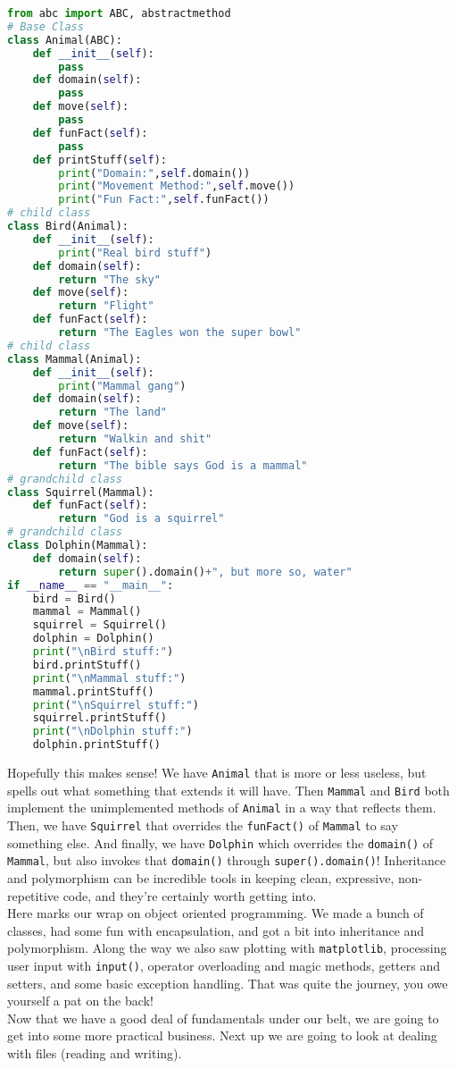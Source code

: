 \documentclass[12pt]{article}
\begin{document}
\begin{lstlisting}[language=Python]
from abc import ABC, abstractmethod 
# Base Class
class Animal(ABC):
    def __init__(self):
        pass
    def domain(self):
        pass
    def move(self):
        pass
    def funFact(self):
        pass
    def printStuff(self):
        print("Domain:",self.domain())
        print("Movement Method:",self.move())
        print("Fun Fact:",self.funFact())
# child class
class Bird(Animal):
    def __init__(self):
        print("Real bird stuff")
    def domain(self):
        return "The sky"
    def move(self):
        return "Flight"
    def funFact(self):
        return "The Eagles won the super bowl"
# child class
class Mammal(Animal):
    def __init__(self):
        print("Mammal gang")
    def domain(self):
        return "The land"
    def move(self):
        return "Walkin and shit"
    def funFact(self):
        return "The bible says God is a mammal"
# grandchild class
class Squirrel(Mammal):
    def funFact(self):
        return "God is a squirrel"
# grandchild class
class Dolphin(Mammal):
    def domain(self):
        return super().domain()+", but more so, water"
if __name__ == "__main__":
    bird = Bird()
    mammal = Mammal()
    squirrel = Squirrel()
    dolphin = Dolphin()
    print("\nBird stuff:")
    bird.printStuff()
    print("\nMammal stuff:")
    mammal.printStuff()
    print("\nSquirrel stuff:")
    squirrel.printStuff()
    print("\nDolphin stuff:")
    dolphin.printStuff()
\end{lstlisting}
Hopefully this makes sense! We have \texttt{Animal} that is more or less useless, but spells out what something that extends it will have. Then \texttt{Mammal} and \texttt{Bird} both implement the unimplemented methods of \texttt{Animal} in a way that reflects them. Then, we have \texttt{Squirrel} that overrides the \texttt{funFact()} of \texttt{Mammal} to say something else. And finally, we have \texttt{Dolphin} which overrides the \texttt{domain()} of \texttt{Mammal}, but also invokes that \texttt{domain()} through \texttt{super().domain()}! Inheritance and polymorphism can be incredible tools in keeping clean, expressive, non-repetitive code, and they're certainly worth getting into.\\
Here marks our wrap on object oriented programming. We made a bunch of classes, had some fun with encapsulation, and got a bit into inheritance and polymorphism. Along the way we also saw plotting with \texttt{matplotlib}, processing user input with \texttt{input()}, operator overloading and magic methods, getters and setters, and some basic exception handling. That was quite the journey, you owe yourself a pat on the back!\\
Now that we have a good deal of fundamentals under our belt, we are going to get into some more practical business. Next up we are going to look at dealing with files (reading and writing).\\
\end{document}
